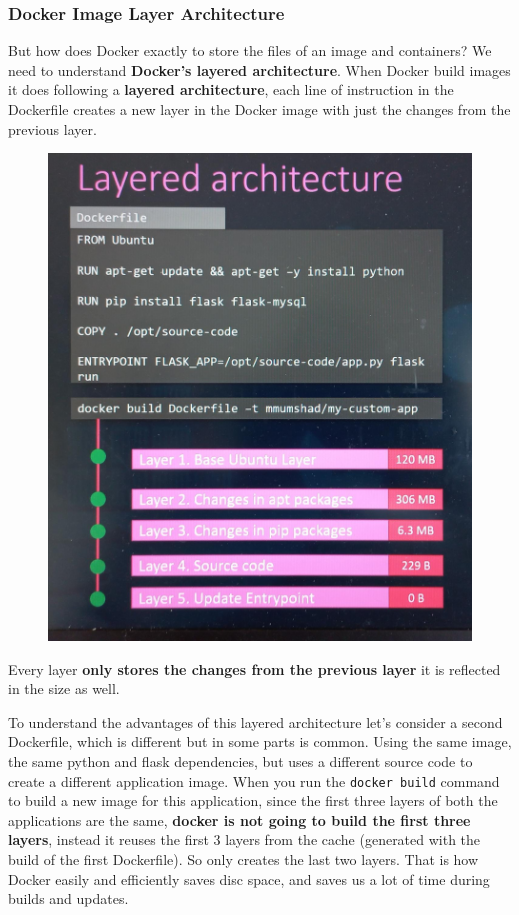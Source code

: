 \documentclass{article}
\begin{document}
\subsubsection{Docker Image Layer Architecture}

But how does Docker exactly to store the files of an image and containers? We need to understand \textbf{Docker's layered architecture}. When Docker build images it does following a \textbf{layered architecture}, each line of instruction in the Dockerfile creates a new layer in the Docker image with just the changes from the previous layer.

\begin{figure}[H]
    \centering
    \includegraphics[scale=0.15]{pictures/st1.png}
\end{figure}

Every layer \textbf{only stores the changes from the previous layer} it is reflected in the size as well.

To understand the advantages of this layered architecture let's consider a second Dockerfile, which is different but in some parts is common. Using the same image, the same python and flask dependencies, but uses a different source code to create a different application image. When you run the \verb|docker build| command to build a new image for this application, since the first three layers of both the applications are the same, \textbf{docker is not going to build the first three layers}, instead it reuses the first 3 layers from the cache (generated with the build of the first Dockerfile). So only creates the last two layers. That is how Docker easily and efficiently saves disc space, and saves us a lot of time during builds and updates.
\end{document}
